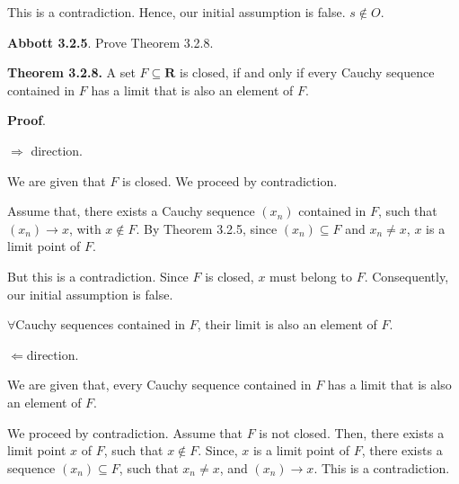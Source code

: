 \documentclass[10pt]{article}
\begin{document}
This is a contradiction. Hence, our initial assumption is false. $\displaystyle s\notin O$.



\textbf{Abbott 3.2.5}. Prove Theorem 3.2.8.



\textbf{Theorem 3.2.8. }A set $\displaystyle F\subseteq \mathbf{R}$ is closed, if and only if every Cauchy sequence contained in $\displaystyle F$ has a limit that is also an element of $\displaystyle F$.



\textbf{Proof}. 

$\displaystyle \Longrightarrow $ direction. 



We are given that $\displaystyle F$ is closed. We proceed by contradiction. 



Assume that, there exists a Cauchy sequence $\displaystyle ( x_{n})$ contained in $\displaystyle F$, such that $\displaystyle ( x_{n})\rightarrow x$, with $\displaystyle x\notin F$. By Theorem 3.2.5, since $\displaystyle ( x_{n}) \subseteq F$ and $\displaystyle x_{n} \neq x$, $\displaystyle x$ is a limit point of $\displaystyle F$. 



But this is a contradiction. Since $\displaystyle F$ is closed, $\displaystyle x$ must belong to $\displaystyle F$. Consequently, our initial assumption is false. 



$\displaystyle \forall $Cauchy sequences contained in $\displaystyle F$, their limit is also an element of $\displaystyle F$.



$\displaystyle \Longleftarrow $direction.



We are given that, every Cauchy sequence contained in $\displaystyle F$ has a limit that is also an element of $\displaystyle F$. 



We proceed by contradiction. Assume that $\displaystyle F$ is not closed. Then, there exists a limit point $\displaystyle x$ of $\displaystyle F$, such that $\displaystyle x\notin F$. Since, $\displaystyle x$ is a limit point of $\displaystyle F$, there exists a sequence $\displaystyle ( x_{n}) \subseteq F$, such that $\displaystyle x_{n} \neq x$, and $\displaystyle ( x_{n})\rightarrow x$. This is a contradiction.
\end{document}
